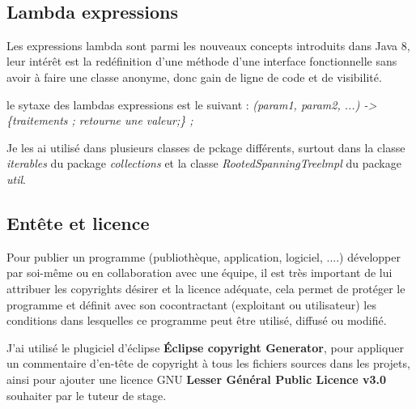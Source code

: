 \documentclass[12pt]{report}
\begin{document}
\newpage
~\\
\subsection{Lambda expressions}


Les expressions lambda sont parmi les nouveaux concepts introduits dans Java 8, leur intérêt est la redéfinition d'une méthode d'une interface fonctionnelle sans avoir à faire une classe anonyme, donc gain de ligne de code et de visibilité.\newline

le sytaxe des lambdas expressions est le suivant :\newline
\textit{(param1, param2, ...) -> \{traitements ; retourne une valeur;\} ;} \newline

Je les ai utilisé dans plusieurs classes de pckage différents, surtout dans la classe \textit{iterables} du package \textit{collections} et la classe \textit{RootedSpanningTreelmpl} du package \textit{util}.\newline

\subsection{Entête et licence}

Pour publier un programme (publiothèque, application, logiciel, ....) développer par soi-même ou en collaboration avec une équipe, il est très important de lui attribuer les copyrights désirer et la licence adéquate, cela permet de protéger le programme et définit avec son cocontractant (exploitant ou utilisateur) les conditions dans lesquelles ce programme peut être utilisé, diffusé ou modifié.\newline

J'ai utilisé le plugiciel d'éclipse \textbf{Éclipse copyright Generator}, pour appliquer un commentaire d'en-tête de copyright à tous les fichiers sources dans les projets, ainsi pour ajouter une licence GNU \textbf{Lesser Général Public Licence v3.0} souhaiter par le tuteur de stage.\newline 
\end{document}
